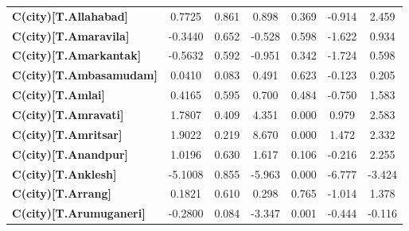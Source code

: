 \begin{center}
\begin{tabular}{lcccccc}
\textbf{C(city)[T.Allahabad]}                                                                       &       0.7725  &        0.861     &     0.898  &         0.369        &       -0.914    &        2.459     \\
\textbf{C(city)[T.Amaravila]}                                                                       &      -0.3440  &        0.652     &    -0.528  &         0.598        &       -1.622    &        0.934     \\
\textbf{C(city)[T.Amarkantak]}                                                                      &      -0.5632  &        0.592     &    -0.951  &         0.342        &       -1.724    &        0.598     \\
\textbf{C(city)[T.Ambasamudam]}                                                                     &       0.0410  &        0.083     &     0.491  &         0.623        &       -0.123    &        0.205     \\
\textbf{C(city)[T.Amlai]}                                                                           &       0.4165  &        0.595     &     0.700  &         0.484        &       -0.750    &        1.583     \\
\textbf{C(city)[T.Amravati]}                                                                        &       1.7807  &        0.409     &     4.351  &         0.000        &        0.979    &        2.583     \\
\textbf{C(city)[T.Amritsar]}                                                                        &       1.9022  &        0.219     &     8.670  &         0.000        &        1.472    &        2.332     \\
\textbf{C(city)[T.Anandpur]}                                                                        &       1.0196  &        0.630     &     1.617  &         0.106        &       -0.216    &        2.255     \\
\textbf{C(city)[T.Anklesh]}                                                                         &      -5.1008  &        0.855     &    -5.963  &         0.000        &       -6.777    &       -3.424     \\
\textbf{C(city)[T.Arrang]}                                                                          &       0.1821  &        0.610     &     0.298  &         0.765        &       -1.014    &        1.378     \\
\textbf{C(city)[T.Arumuganeri]}                                                                     &      -0.2800  &        0.084     &    -3.347  &         0.001        &       -0.444    &       -0.116     \\

\end{tabular}
\end{center}
